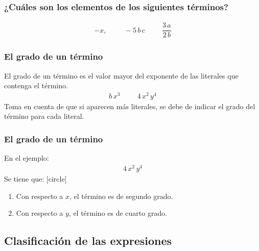\begin{frame}
\frametitle{¿Cuáles son los elementos de los siguientes términos?}
\begin{align*}
-x, \hspace{1cm} - 5 \, b \, c \hspace{1cm} \dfrac{3 \, a}{2 \, b}
\end{align*}
\end{frame}
\begin{frame}
\frametitle{El grado de un término}
El grado de un término es el valor mayor del exponente de las literales que contenga el término.
\pause
\begin{align*}
b \, x^{3} \hspace{1cm} 4 \, x^{2} \, y^{4}
\end{align*}
\pause
Toma en cuenta de que si aparecen más literales, se debe de indicar el grado del término para cada literal.
\end{frame}
\begin{frame}
\frametitle{El grado de un término}
En el ejemplo:
\begin{align*}
4 \, x^{2} \, y^{4}
\end{align*}
\pause
Se tiene que:
[circle]
\begin{enumerate}[<+->]
\item Con respecto a $x$, el término es de segundo grado.
\item Con respecto a $y$, el término es de cuarto grado.
\end{enumerate}
\end{frame}

\subsection{Clasificación de las expresiones}

